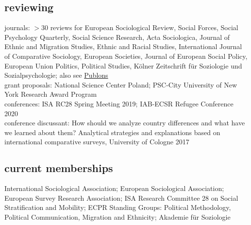 \documentclass[11pt, a4paper]{article}
\begin{document}
\subsection*{reviewing}
journals: $>$30 reviews for European Sociological Review, Social Forces, Social Psychology Quarterly, Social Science Research, Acta Sociologica, Journal of Ethnic and Migration Studies, Ethnic and Racial Studies, International Journal of Comparative Sociology, European Societies, Journal of European Social Policy, European Union Politics, Political Studies, Kölner Zeitschrift für Soziologie und Sozialpsychologie; also see \href{https://publons.com/researcher/3006411/christian-s-czymara/}{Publons}\\

grant proposals: National Science Center Poland; PSC-City University of New York Research Award Program\\

conferences: ISA RC28 Spring Meeting 2019; IAB-ECSR Refugee Conference 2020\\

conference discussant: How should we analyze country differences and what have we learned about them? Analytical strategies and explanations based on international comparative surveys, University of Cologne 2017\\
\subsection*{current memberships}
International Sociological Association; European Sociological Association; European Survey Research Association; ISA Research Committee 28 on Social Stratification and Mobility; ECPR Standing Groups: Political Methodology, Political Communication, Migration and Ethnicity; Akademie für Soziologie\\
\end{document}
